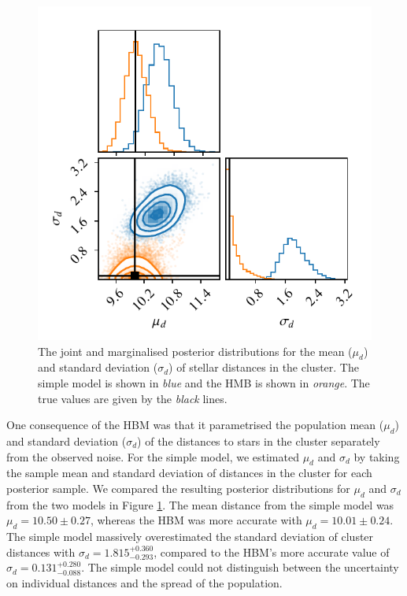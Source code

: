 \begin{figure}[tb]
    \centering
    \includegraphics{figures/hbm-global.pdf}
    \caption[The joint and marginalised posterior distributions for the mean and standard deviation of stellar distances in the cluster]{The joint and marginalised posterior distributions for the mean (\(\mu_d\)) and standard deviation (\(\sigma_d\)) of stellar distances in the cluster. The simple model is shown in \emph{blue} and the HMB is shown in \emph{orange}. The true values are given by the \emph{black} lines.}
    \label{fig:hbm-global}
\end{figure}

One consequence of the HBM was that it parametrised the population mean (\(\mu_d\)) and standard deviation (\(\sigma_d\)) of the distances to stars in the cluster separately from the observed noise. For the simple model, we estimated \(\mu_d\) and \(\sigma_d\) by taking the sample mean and standard deviation of distances in the cluster for each posterior sample. We compared the resulting posterior distributions for \(\mu_d\) and \(\sigma_d\) from the two models in Figure \ref{fig:hbm-global}. The mean distance from the simple model was \(\mu_d = 10.50 \pm 0.27\), whereas the HBM was more accurate with \(\mu_d = 10.01 \pm 0.24\). The simple model massively overestimated the standard deviation of cluster distances with \(\sigma_d = 1.815_{-0.293}^{+0.360}\), compared to the HBM's more accurate value of \(\sigma_d = 0.131_{-0.088}^{+0.280}\). The simple model could not distinguish between the uncertainty on individual distances and the spread of the population.

